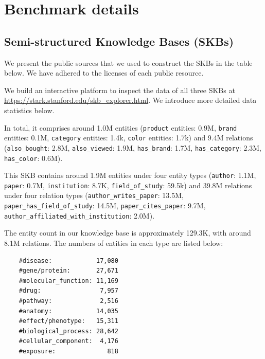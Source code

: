 \section{Benchmark details}
\label{app:details}

\subsection{Semi-structured Knowledge Bases (SKBs)}
\label{app:skb}

We present the public sources that we used to construct the SKBs in the table below. We have adhered to the licenses of each public resource.


We build an interactive platform to inspect the data of all three SKBs at \textcolor{cyan}{\url{https://stark.stanford.edu/skb_explorer.html}}. 
We introduce more detailed data statistics below. 

 In total, it comprises around 1.0M entities (\texttt{product} entities: 0.9M, \texttt{brand} entities: 0.1M, \texttt{category} entities: 1.4k, \texttt{color} entities: 1.7k) and 9.4M relations (\texttt{also\_bought}: 2.8M, \texttt{also\_viewed}: 1.9M, \texttt{has\_brand}: 1.7M, \texttt{has\_category}: 2.3M, \texttt{has\_color}: 0.6M).

    This SKB contains around 1.9M entities under four entity types  (\texttt{author}: 1.1M, \texttt{paper}: 0.7M, \texttt{institution}: 8.7K, \texttt{field\_of\_study}: 59.5k) and 39.8M relations under four relation types  (\texttt{author\_writes\_paper}: 13.5M, \texttt{paper\_has\_field\_of\_study}: 14.5M, \texttt{paper\_cites\_paper}: 9.7M, \texttt{author\_affiliated\_with\_institution}: 2.0M). 
    
The entity count in our knowledge base is approximately 129.3K, with around 8.1M relations. The numbers of entities in each type are listed below:
\begin{center}
    \begin{verbatim}
    #disease:            17,080 
    #gene/protein:       27,671 
    #molecular_function: 11,169 
    #drug:                7,957 
    #pathway:             2,516 
    #anatomy:            14,035 
    #effect/phenotype:   15,311 
    #biological_process: 28,642 
    #cellular_component:  4,176 
    #exposure:              818
    \end{verbatim}
\end{center}

\subsection{\revision{\amazont}}
\label{app:amazon}


